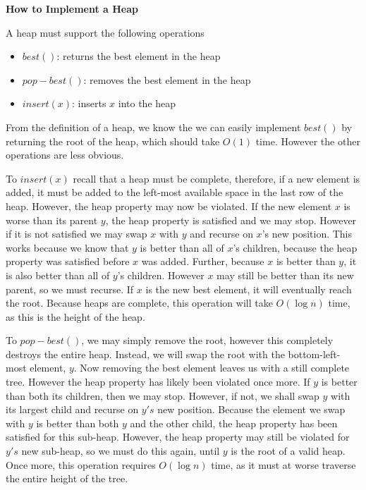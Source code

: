 {\bf How to Implement a Heap}

A heap must support the following operations

\begin{itemize}
\item $best()$: returns the best element in the heap
\item $pop-best()$: removes the best element in the heap
\item $insert(x)$: inserts $x$ into the heap
\end{itemize}

From the definition of a heap, we know the we can easily implement
$best()$ by returning the root of the heap, which should take $O(1)$ time.
However the other operations are less obvious. 

To $insert(x)$ recall that a heap must be complete, therefore, if a new
element is added, it must be added to the left-most available space in the
last row of the heap. However, the heap property may now be violated. 
If the new element $x$ is worse than its parent $y$, the heap property is
satisfied and we may stop. However if it is not satisfied we may swap
$x$ with $y$ and recurse on $x$'s new position. This works because we know
that $y$ is better than all of $x$'s children, because the heap property was
satisfied before $x$ was added. Further, because $x$ is better than $y$, it
is also better than all of $y$'s children. However $x$ may still be better than
its new parent, so we must recurse. If $x$ is the new best element, it will
eventually reach the root. Because heaps are complete, this operation will take
$O(\log n)$ time, as this is the height of the heap.

To $pop-best()$, we may simply remove the root,
however this completely destroys the entire heap. Instead, we will swap
the root with the bottom-left-most element, $y$. Now removing the
best element leaves us with a still complete tree. However the heap property
has likely been violated once more. If $y$ is better than both its children,
then we may stop. However, if not, we shall swap $y$ with its largest child
and recurse on $y's$ new position. Because the element we swap with $y$ is
better than both $y$ and the other child, the heap property has been
satisfied for this sub-heap. However, the heap property may still be violated
for $y's$ new sub-heap, so we must do this again, until $y$ is the root
of a valid heap. Once more, this operation
requires $O(\log n)$ time, as it must at worse traverse the entire height
of the tree. 

